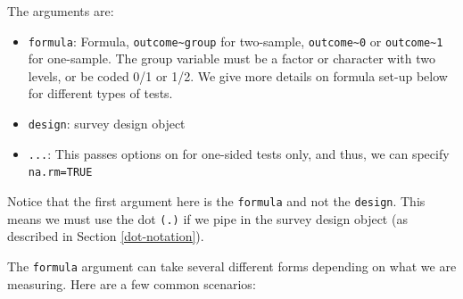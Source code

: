 \documentclass[
]{krantz}
\providecommand{\tightlist}{%
  \setlength{\itemsep}{0pt}\setlength{\parskip}{0pt}}
\begin{document}
The arguments are:

\begin{itemize}
\tightlist
\item
  \texttt{formula}: Formula, \texttt{outcome\textasciitilde{}group} for two-sample, \texttt{outcome\textasciitilde{}0} or \texttt{outcome\textasciitilde{}1} for one-sample. The group variable must be a factor or character with two levels, or be coded 0/1 or 1/2. We give more details on formula set-up below for different types of tests.
\item
  \texttt{design}: survey design object
\item
  \texttt{...}: This passes options on for one-sided tests only, and thus, we can specify \texttt{na.rm=TRUE}
\end{itemize}

Notice that the first argument here is the \texttt{formula} and not the \texttt{design}. This means we must use the dot \texttt{(.)} if we pipe in the survey design object (as described in Section \ref{dot-notation}).

The \texttt{formula} argument can take several different forms depending on what we are measuring. Here are a few common scenarios:
\end{document}
